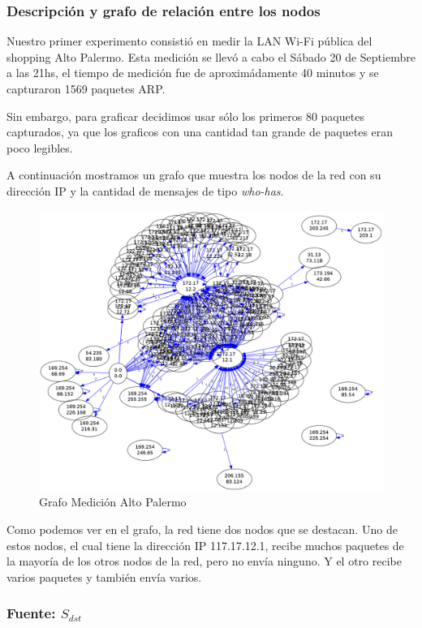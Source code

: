 \subsubsection{Descripción y grafo de relación entre los nodos}

Nuestro primer experimento consistió en medir la LAN Wi-Fi pública del shopping Alto Palermo. Esta medición se llevó a cabo el Sábado 20 de Septiembre a las 21hs, el tiempo de medición fue de aproximádamente 40 minutos y se capturaron 1569 paquetes ARP.

Sin embargo, para graficar decidimos usar sólo los primeros 80 paquetes capturados, ya que los graficos con una cantidad tan grande de paquetes eran poco legibles.

A continuación mostramos un grafo que muestra los nodos de la red con su dirección IP y la cantidad de mensajes de tipo \emph{who-has}.

\begin{figure}[H]
 \begin{center}
  \includegraphics[width=0.9\linewidth]{../imgs/red-alto-palermo_red.png}
  \caption{Grafo Medición Alto Palermo}
 \end{center}

\end{figure}

Como podemos ver en el grafo, la red tiene dos nodos que se destacan. Uno de estos nodos, el cual tiene la dirección IP 117.17.12.1, recibe muchos paquetes de la mayoría de los otros nodos de la red, pero no envía ninguno. Y el otro recibe varios paquetes y también envía varios.

\subsubsection{Fuente: $S_{dst}$}

